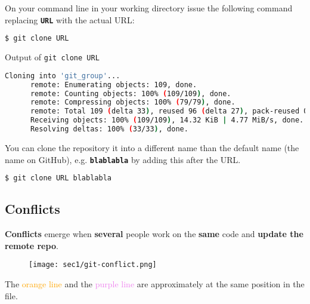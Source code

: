 \begin{frame}[fragile]
\emptyframetitle

  On your command line in your working directory issue the following command replacing \textbf{\texttt{URL}} with the actual URL:

  \begin{lstlisting}[language=bash]
    $ git clone URL 
  \end{lstlisting}

  \vspace*{-0.25cm}
  \begin{block}{Output of \texttt{git clone URL}}
  \vspace*{-0.25cm}
    \begin{lstlisting}[language=bash, basicstyle=\footnotesize\ttfamily]
      Cloning into 'git_group'...
      remote: Enumerating objects: 109, done.
      remote: Counting objects: 100% (109/109), done.
      remote: Compressing objects: 100% (79/79), done.
      remote: Total 109 (delta 33), reused 96 (delta 27), pack-reused 0
      Receiving objects: 100% (109/109), 14.32 KiB | 4.77 MiB/s, done.
      Resolving deltas: 100% (33/33), done.
    \end{lstlisting}
  \end{block}

  You can clone the repository it into a different name than the default name (the name on GitHub), e.g. \textbf{\texttt{blablabla}} by adding this after the URL. 

  \begin{lstlisting}[language=bash]
    $ git clone URL blablabla
  \end{lstlisting}
 
\end{frame}

\subsection{Conflicts}\hypertarget{sec1.8}{}

\begin{frame}[fragile]
\emptyframetitle

  \textbf{Conflicts} emerge when \textbf{several} people work on the \textbf{same} code and \textbf{update the remote repo}.\\[0.25cm]

  \begin{figure}[h]
    \texttt{[image: sec1/git-conflict.png]}
  \end{figure}

  The \textcolor{orange}{orange line} and the \textcolor{violet}{purple line} are approximately at the same position in the file. 

\end{frame}

